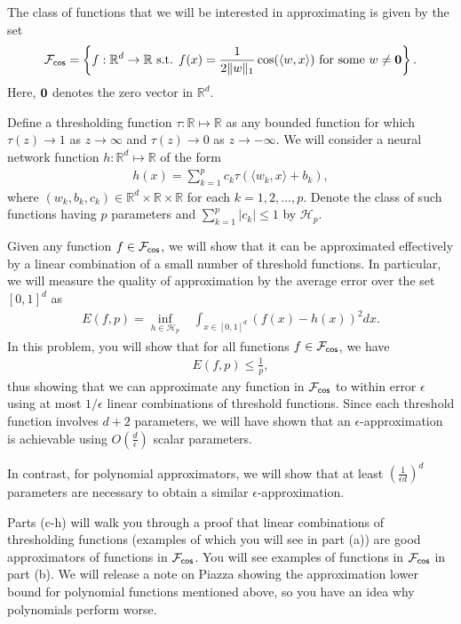 The class of functions that we will be interested in approximating is given by the set 
\begin{align*}
\mathcal{F}_{{\sf cos}} = \left\{f: \mathbb{R}^d \to \mathbb{R} \text{ s.t. } f(x) = \frac{1}{2 \|w\|_1} \cos( \langle w, x \rangle ) \text{ for some } w \neq {\bf 0} \right\}.
\end{align*}
Here, ${\bf 0}$ denotes the zero vector in $\mathbb{R}^d$.

Define a thresholding function $\tau: \mathbb{R} \mapsto \mathbb{R}$ as any bounded function for which $\tau(z) \to 1$ as $z \to \infty$ and $\tau(z) \to 0$ as $z \to -\infty$.
We will consider a neural network function $h: \mathbb{R}^d \mapsto \mathbb{R}$ of the form 
\begin{align*}
h(x) = \sum_{k=1}^p c_k \tau( \langle w_k, x\rangle + b_k),
\end{align*} 
where $(w_k, b_k, c_k) \in \mathbb{R}^d \times \mathbb{R} \times \mathbb{R}$ for each $k = 1, 2, \ldots, p$. Denote the class of such functions having $p$ parameters and $\sum_{k = 1}^p |c_k| \leq 1$ by $\mathcal{H}_p$.

Given any function $f \in \mathcal{F}_{{\sf cos}}$, we will show that it can be approximated effectively by a linear combination of a small number of threshold functions. In particular, we will measure the quality of approximation by the average error over the set $[0, 1]^{d}$ as
\begin{align}
E(f, p) = \inf_{h \in \mathcal{H}_p} \;\;\; \int_{x \in [0,1]^d } (f(x) - h(x))^2 dx. \label{eq:error}
\end{align}
In this problem, you will show that for all functions $f \in \mathcal{F}_{\sf cos}$, we have
\begin{align*}
E(f, p) \leq \frac{1}{p},
\end{align*}
thus showing that we can approximate any function in $\mathcal{F}_{\sf cos}$ to within error $\epsilon$ using at most $1/ \epsilon$ linear combinations of threshold functions. Since each threshold function involves $d + 2$ parameters, we will have shown that an $\epsilon$-approximation is achievable using $O\left( \frac{d}{\epsilon} \right)$ scalar parameters. 

In contrast, for polynomial approximators, we will show that at least $\left( \frac{1}{\epsilon d} \right)^d$ parameters are necessary to obtain a similar $\epsilon$-approximation.

Parts (c-h) will walk you through a proof that linear combinations of thresholding functions (examples of which you will see in part (a)) are good approximators of functions in $\mathcal{F}_{\sf cos}$. You will see examples of functions in $\mathcal{F}_{\sf cos}$ in part (b). We will release a note on Piazza showing the approximation lower bound for polynomial functions mentioned above, so you have an idea why polynomials perform worse.


